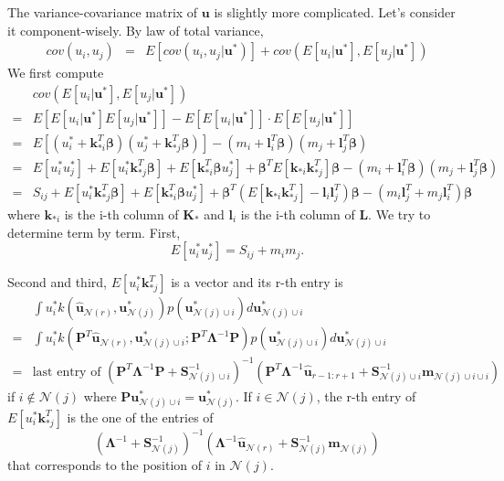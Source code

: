 \documentclass[11pt, reqno]{amsart}
\begin{document}
The variance-covariance matrix of $\mathbf{u}$ is slightly more complicated. Let's consider it component-wisely. By law of total variance, 
\begin{eqnarray*}
cov(u_{i},u_{j}) & = & E[cov(u_{i},u_{j}\vert\mathbf{u}^{*})]+cov(E[u_{i}\vert\mathbf{u}^{*}],E[u_{j}\vert\mathbf{u}^{*}])
\end{eqnarray*}
We first compute 
\begin{align*}
 & cov(E[u_{i}\vert\mathbf{u}^{*}],E[u_{j}\vert\mathbf{u}^{*}])\\
= & E[E[u_{i}\vert\mathbf{u}^{*}]E[u_{j}\vert\mathbf{u}^{*}]]-E[E[u_{i}\vert\mathbf{u}^{*}]]\cdot E[E[u_{j}\vert\mathbf{u}^{*}]]\\
= & E[(u_{i}^{*}+\mathbf{k}_{*i}^{T}\boldsymbol{\beta})(u_{j}^{*}+\mathbf{k}_{*j}^{T}\boldsymbol{\beta})]-(m_{i}+\mathbf{l}_{i}^{T}\boldsymbol{\beta})(m_{j}+\mathbf{l}_{j}^{T}\boldsymbol{\beta})\\
= & E[u_{i}^{*}u_{j}^{*}]+E[u_{i}^{*}\mathbf{k}_{*j}^{T}\boldsymbol{\beta}]+E[\mathbf{k}_{*i}^{T}\boldsymbol{\beta}u_{j}^{*}]+\boldsymbol{\beta}^{T}E[\mathbf{k}_{*i}\mathbf{k}_{*j}^{T}]\boldsymbol{\beta}-(m_{i}+\mathbf{l}_{i}^{T}\boldsymbol{\beta})(m_{j}+\mathbf{l}_{j}^{T}\boldsymbol{\beta})\\
= & S_{ij}+E[u_{i}^{*}\mathbf{k}_{*j}^{T}\boldsymbol{\beta}]+E[\mathbf{k}_{*i}^{T}\boldsymbol{\beta}u_{j}^{*}]+\boldsymbol{\beta}^{T}(E[\mathbf{k}_{*i}\mathbf{k}_{*j}^{T}]-\mathbf{l}_{i}\mathbf{l}_{j}^{T})\boldsymbol{\beta}-(m_{i}\mathbf{l}_{j}^{T}+m_{j}\mathbf{l}_{i}^{T})\boldsymbol{\beta}
\end{align*}
where $\mathbf{k}_{*i}$ is the i-th column of $\mathbf{K}_{*}$ and $\mathbf{l}_{i}$ is the i-th column of $\mathbf{L}$. We try to determine term by term. First, 
\[
E[u_{i}^{*}u_{j}^{*}]=S_{ij}+m_{i}m_{j}.
\]

Second and third, $E[u_{i}^{*}\mathbf{k}_{*j}^{T}]$ is a vector and its r-th entry is 
\begin{align*}
 & \int u_{i}^{*}k(\hat{\mathbf{u}}_{\mathcal{N}(r)},\mathbf{u}_{\mathcal{N}(j)}^{*})p(\mathbf{u}_{\mathcal{N}(j)\cup i}^{*})d\mathbf{u}_{\mathcal{N}(j)\cup i}^{*}\\
= & \int u_{i}^{*}k(\mathbf{P}^{T}\hat{\mathbf{u}}_{\mathcal{N}(r)},\mathbf{u}_{\mathcal{N}(j)\cup i}^{*};\mathbf{P}^{T}\boldsymbol{\Lambda}^{-1}\mathbf{P})p(\mathbf{u}_{\mathcal{N}(j)\cup i}^{*})d\mathbf{u}_{\mathcal{N}(j)\cup i}^{*}\\
= & \text{last entry of }(\mathbf{P}^{T}\boldsymbol{\Lambda}^{-1}\mathbf{P}+\mathbf{S}_{\mathcal{N}(j)\cup i}^{-1})^{-1}(\mathbf{P}^{T}\boldsymbol{\Lambda}^{-1}\hat{\mathbf{u}}_{r-1:r+1}+\mathbf{S}_{\mathcal{N}(j)\cup i}^{-1}\mathbf{m}_{\mathcal{N}(j)\cup i\cup i})
\end{align*}
if $i\notin\mathcal{N}(j)$ where $\mathbf{P}\mathbf{u}_{\mathcal{N}(j)\cup i}^{*}=\mathbf{u}_{\mathcal{N}(j)}^{*}$. If $i\in\mathcal{N}(j)$, the r-th entry of $E[u_{i}^{*}\mathbf{k}_{*j}^{T}]$ is the one of the entries of 
\[
(\boldsymbol{\Lambda}^{-1}+\mathbf{S}_{\mathcal{N}(j)}^{-1})^{-1}(\boldsymbol{\Lambda}^{-1}\hat{\mathbf{u}}_{\mathcal{N}(r)}+\mathbf{S}_{\mathcal{N}(j)}^{-1}\mathbf{m}_{\mathcal{N}(j)})
\]
 that corresponds to the position of $i$ in $\mathcal{N}(j)$.
\end{document}
